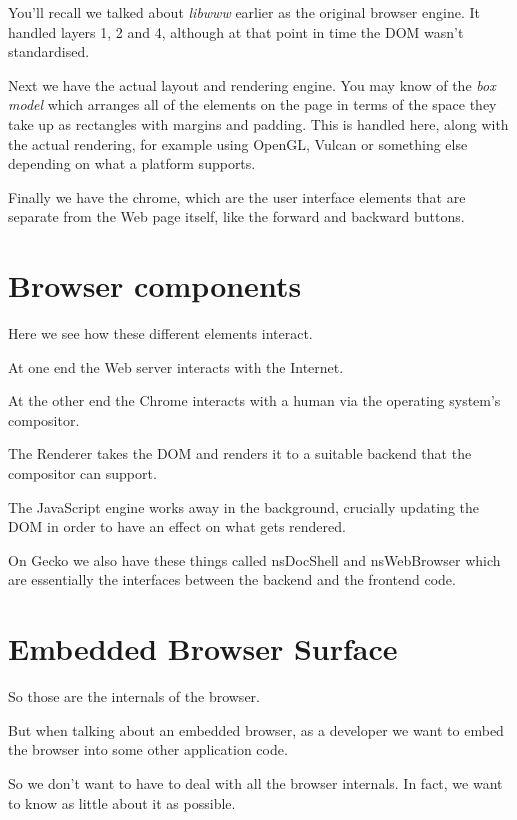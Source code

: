 \documentclass{article}
\begin{document}
You'll recall we talked about {\it libwww\/} earlier as the original browser engine. It handled layers 1, 2 and 4, although at that point in time the DOM wasn't standardised.

Next we have the actual layout and rendering engine. You may know of the {\it box model\/} which arranges all of the elements on the page in terms of the space they take up as rectangles with margins and padding. This is handled here, along with the actual rendering, for example using OpenGL, Vulcan or something else depending on what a platform supports.

Finally we have the chrome, which are the user interface elements that are separate from the Web page itself, like the forward and backward buttons.


\section{Browser components}

Here we see how these different elements interact.

At one end the Web server interacts with the Internet.

At the other end the Chrome interacts with a human via the operating system's compositor.

The Renderer takes the DOM and renders it to a suitable backend that the compositor can support.

The JavaScript engine works away in the background, crucially updating the DOM in order to have an effect on what gets rendered.

On Gecko we also have these things called {\code nsDocShell} and {\code nsWebBrowser} which are essentially the interfaces between the backend and the frontend code.


\section{Embedded Browser Surface}

So those are the internals of the browser.

But when talking about an embedded browser, as a developer we want to embed the browser into some other application code.

So we don't want to have to deal with all the browser internals. In fact, we want to know as little about it as possible.
\end{document}
